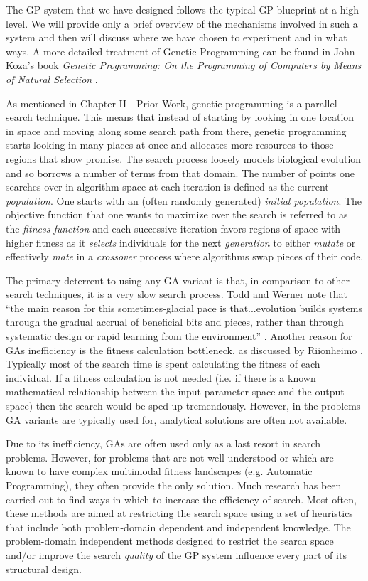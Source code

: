 \documentclass[12pt]{report} 	%
\numberwithin{figure}{chapter}
\numberwithin{table}{chapter}
\numberwithin{equation}{chapter}
\begin{document}
\begin{flushleft}
The GP system that we have designed follows the typical GP blueprint at a high level. We will provide only a brief overview of the mechanisms involved in such a system and then will discuss where we have chosen to experiment and in what ways. A more detailed treatment of Genetic Programming can be found in John Koza's book \textit{Genetic Programming: On the Programming of Computers by Means of Natural Selection} \cite{Koza:1992gp}.

As mentioned in Chapter II - Prior Work, genetic programming is a parallel search technique. This means that instead of starting by looking in one location in space and moving along some search path from there, genetic programming starts looking in many places at once and allocates more resources to those regions that show promise. The search process loosely models biological evolution and so borrows a number of terms from that domain. The number of points one searches over in algorithm space at each iteration is defined as the current \textit{population}. One starts with an (often randomly generated) \textit{initial population}. The objective function that one wants to maximize over the search is referred to as the \textit{fitness function} and each successive iteration favors regions of space with higher fitness as it \textit{selects} individuals for the next \textit{generation} to either \textit{mutate} or effectively \textit{mate} in a  \textit{crossover} process where algorithms swap pieces of their code.

The primary deterrent to using any GA variant is that, in comparison to other search techniques, it is a very slow search process. Todd and Werner note that ``the main reason for this sometimes-glacial pace is that...evolution builds systems through the gradual accrual of beneficial bits and pieces, rather than through systematic design or rapid learning from the environment'' \cite[p. 5]{Todd:1998tg}. Another reason for GAs inefficiency is the fitness calculation bottleneck, as discussed by Riionheimo \cite[p.10]{Riionheimo:2003qo}. Typically most of the search time is spent calculating the fitness of each individual. If a fitness calculation is not needed (i.e. if there is a known mathematical relationship between the input parameter space and the output space) then the search would be sped up tremendously. However, in the problems GA variants are typically used for, analytical solutions are often not available.

Due to its inefficiency, GAs are often used only as a last resort in search problems. However, for problems that are not well understood or which are known to have complex multimodal fitness landscapes (e.g. Automatic Programming), they often provide the only solution. Much research has been carried out to find ways in which to increase the efficiency of search. Most often, these methods are aimed at restricting the search space using a set of heuristics that include both problem-domain dependent and independent knowledge. The problem-domain independent methods designed to restrict the search space and/or improve the search \textit{quality} of the GP system influence every part of its structural design. 


\end{flushleft}
\end{document}
